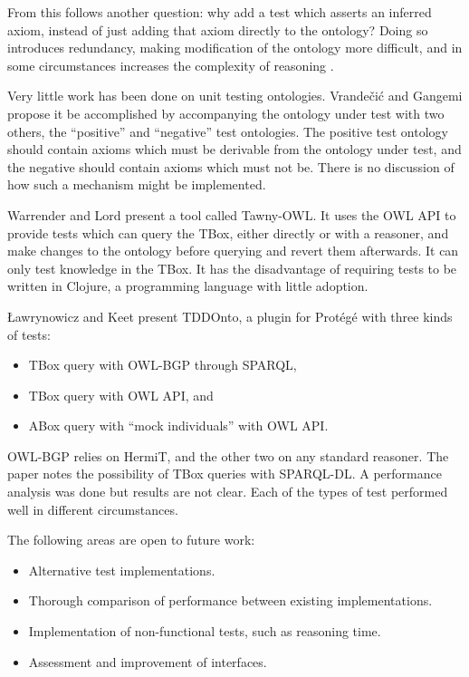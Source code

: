 \documentclass{sig-alternate}
\begin{document}
From this follows another question: why add a test which asserts an inferred axiom, instead of just adding that axiom directly to the ontology?  Doing so introduces redundancy, making modification of the ontology more difficult, and in some circumstances increases the complexity of reasoning \cite{Vrandecic:UnitTestsOntologies}.

Very little work has been done on unit testing ontologies.
Vrande\v{c}i\'c and Gangemi \cite{Vrandecic:UnitTestsOntologies} propose it be accomplished by accompanying the ontology under test with two others, the ``positive'' and ``negative'' test ontologies.  The positive test ontology should contain axioms which must be derivable from the ontology under test, and the negative should contain axioms which must not be.  There is no discussion of how such a mechanism might be implemented.

Warrender and Lord \cite{Warrender:HowWhatWhyTest} present a tool called Tawny-OWL.  It uses the OWL API to provide tests which can query the TBox, either directly or with a reasoner, and make changes to the ontology before querying and revert them afterwards.  It can only test knowledge in the TBox.  It has the disadvantage of requiring tests to be written in Clojure, a programming language with little adoption.

{\L}awrynowicz and Keet \cite{Lawrynowicz:TDDontoTool} present TDDOnto, a plugin for Prot\'eg\'e with three kinds of tests:
\begin{itemize}[nosep]
  \item TBox query with OWL-BGP through SPARQL,
  \item TBox query with OWL API, and
  \item ABox query with ``mock individuals'' with OWL API.
\end{itemize}
OWL-BGP relies on HermiT, and the other two on any standard reasoner.
The paper notes the possibility of TBox queries with SPARQL-DL.
A performance analysis was done but results are not clear.  Each of the types of test performed well in different circumstances.

The following areas are open to future work:
\begin{itemize}[nosep]
  \item Alternative test implementations.
  \item Thorough comparison of performance between existing implementations.
  \item Implementation of non-functional tests, such as reasoning time.
  \item Assessment and improvement of interfaces.
\end{itemize}
\end{document}
